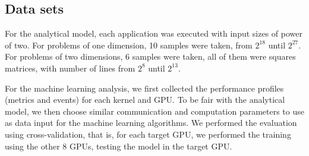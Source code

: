 \begin{table}[htpb]
    \centering
    \caption{Hardware specifications of the GPUs in the testbed}
    \label{tab:GPUs}
\end{table}


\subsection{Data sets}\label{ssec:DataSets}
For the analytical model, each application was executed with input sizes of power of two. For problems of one dimension, 10 samples were taken, from $2^{18}$ until $2^{27}$. For problems of two dimensions, 6 samples were taken, all of them were squares matrices, with number of lines from $2^{8}$ until $2^{13}$.

For the machine learning analysis, we first collected the performance profiles (metrics and events) for each kernel and GPU. To be fair with the analytical model, we then choose similar communication and computation parameters to use as data input for the machine learning algorithms. We performed the evaluation using cross-validation, that is, for each target GPU, we performed the training using the other 8 GPUs, testing the model in the target GPU.

